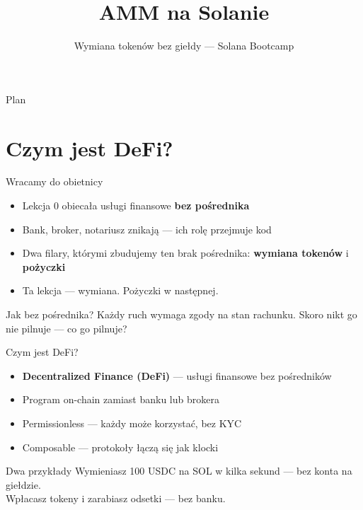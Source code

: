 

\usepackage[utf8]{inputenc}
\usepackage[T1]{fontenc}
\usepackage{amsmath}

\title{AMM na Solanie}
\subtitle{Wymiana tokenów bez giełdy --- Solana Bootcamp}
\author{}



\maketitleframe

\begin{frame}{Plan}
  \tableofcontents
\end{frame}

\section{Czym jest DeFi?}

\begin{frame}{Wracamy do obietnicy}
  \begin{itemize}
    \item Lekcja 0 obiecała usługi finansowe \textbf{bez pośrednika}
    \item Bank, broker, notariusz znikają --- ich rolę przejmuje kod
    \item Dwa filary, którymi zbudujemy ten brak pośrednika: \textbf{wymiana tokenów} i \textbf{pożyczki}
    \item Ta lekcja --- wymiana. Pożyczki w następnej.
  \end{itemize}
  \vspace{0.25cm}
  \begin{alertblock}{Jak bez pośrednika?}
    Każdy ruch wymaga zgody na stan rachunku. Skoro nikt go nie pilnuje ---
    co go pilnuje?
  \end{alertblock}
\end{frame}

\begin{frame}{Czym jest DeFi?}
  \begin{itemize}
    \item \textbf{Decentralized Finance (DeFi)} --- usługi finansowe bez pośredników
    \item Program on-chain zamiast banku lub brokera
    \item Permissionless --- każdy może korzystać, bez KYC
    \item Composable --- protokoły łączą się jak klocki
  \end{itemize}
  \vspace{0.3cm}
  \begin{exampleblock}{Dwa przykłady}
    Wymieniasz 100 USDC na SOL w kilka sekund --- bez konta na giełdzie. \\
    Wpłacasz tokeny i zarabiasz odsetki --- bez banku.
  \end{exampleblock}
\end{frame}


